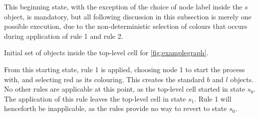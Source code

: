 This beginning state, with the exception of the choice of node label inside the \(s\) object, is mandatory, but all following discussion in this subsection is merely one possible execution, due to the non-deterministic selection of colours that occurs during application of rule 1 and rule 2.


\begin{cpobjectsfloat}
\begin{cpobjects}
\end{cpobjects}
\caption{\label{objs:gcol:obj1}Initial set of objects inside the top-level cell for \autoref{fig:examplegraph}.}
\end{cpobjectsfloat}

From this starting state, rule 1 is applied, choosing node 1 to start the process with, and selecting red as its colouring.  This creates the standard \(b\) and \(l\) objects.  No other rules are applicable at this point, as the top-level cell started in state \(s_0\).  The application of this rule leaves the top-level cell in state \(s_1\).  Rule 1 will henceforth be inapplicable, as the rules provide no way to revert to state \(s_0\).

